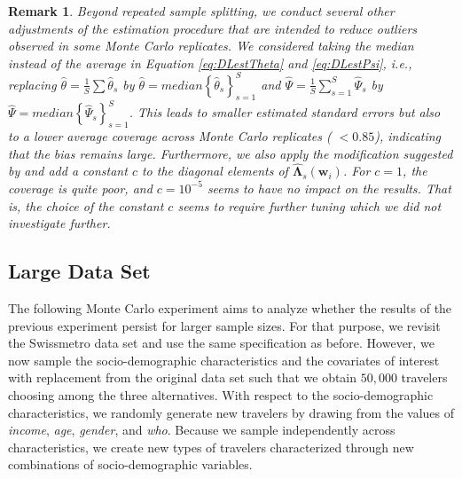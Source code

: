 \documentclass[a4paper, 12pt]{article}
\newtheorem{preremark}{Remark}
\newenvironment{remark}%
  {\begin{preremark}\upshape}{\end{preremark}}
\begin{document}
\begin{remark} 
Beyond  repeated sample splitting, we conduct several other adjustments of the estimation procedure that are intended to reduce  outliers observed in some Monte Carlo replicates. We considered taking the median instead of the average  in Equation \eqref{eq:DLestTheta}  and \eqref{eq:DLestPsi}, i.e., replacing $\hat{\theta}=\frac{1}{S}\sum\limits\hat{\theta}_s$  by $\hat{\theta}=median\left\{\hat{\theta}_s \right\}_{s=1}^{S}$ and  $\hat{\Psi}=\frac{1}{S}\sum\limits_{s=1}^S\hat{\Psi}_s$ by $\hat{\Psi}=median\left\{\hat{\Psi}_s \right\}_{s=1}^{S}$. This leads to smaller estimated standard errors but also to a lower average coverage across Monte Carlo replicates ( $ < 0.85$), indicating that the bias remains large. Furthermore, we also apply the modification suggested by  and add a constant $c$ to the diagonal elements of $\hat{\bm{\Lambda}}_s(\bm{w}_i)$. For $c=1$, the coverage is quite poor, and $c=10^{-5}$ seems to have no impact on the results. That is, the choice of the constant $c$ seems to require further tuning which we did not investigate further.
\end{remark}



\subsection{Large Data Set}  \label{subsecDL:largeMC}
The following Monte Carlo experiment aims to analyze whether the results of the previous experiment persist for larger sample sizes. 
For that purpose, we revisit the Swissmetro data set and use the same specification as before. However, we now sample the socio-demographic characteristics and the covariates of interest with replacement from the original data set such that we obtain $50,000$ travelers choosing among the three alternatives. With respect to the socio-demographic characteristics, we randomly generate new travelers by drawing from the values of \textit{income}, \textit{age}, \textit{gender}, and \textit{who}.
Because we sample independently across characteristics, we create new types of travelers characterized through new combinations of socio-demographic variables.
\end{document}

